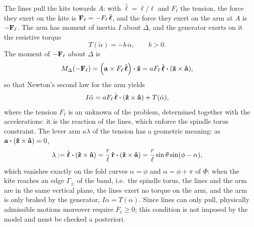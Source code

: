 The lines pull the kite towards \(A\): with \(\hat{\boldsymbol{\ell}} = \boldsymbol{\ell}/\ell\) and \(F_\ell\) the tension, the force they exert on the kite is \(\vb F_\ell = -F_\ell\,\hat{\boldsymbol{\ell}}\), and the force they exert on the arm at \(A\) is \(-\vb F_\ell\).
The arm has moment of inertia \(I\) about \(\Delta\), and the generator exerts on it the resistive torque
\begin{equation}
    T(\dot\alpha) = -b\,\dot\alpha, \qquad b>0.
\end{equation}
The moment of \(-\vb F_\ell\) about \(\Delta\) is
\begin{equation} \label{eq:moment_fell}
    M_\Delta(-\vb F_\ell) = \qty(\vb a\times F_\ell\,\hat{\boldsymbol{\ell}})\vdot\vu z = a F_\ell\,\hat{\boldsymbol{\ell}} \vdot (\vu z \times \vu a),
\end{equation}
so that Newton's second law for the arm yields
\begin{equation} \label{eq:newton_arm}
    I \ddot\alpha = a F_\ell\,\hat{\boldsymbol{\ell}} \vdot (\vu z \times \vu a) + T(\dot \alpha),
\end{equation}
where the tension \(F_\ell\) is an unknown of the problem, determined together with the accelerations: it is the reaction of the lines, which enforce the spindle torus constraint.
The lever arm \(a\lambda\) of the tension has a geometric meaning:
as \(\vb a\vdot(\vu z\times\vu a) = 0\),
\begin{equation} \label{eq:lever-arm}
    \lambda := \hat{\boldsymbol{\ell}} \vdot (\vu z \times \vu a) = \frac{r}{\ell}\,\vu r\vdot(\vu z\times\vu a) = \frac{r}{\ell}\sin\theta\sin(\phi-\alpha),
\end{equation}
which vanishes exactly on the fold curves \(\alpha = \phi\) and \(\alpha = \phi+\pi\) of \(\Phi\): when the kite reaches an edge \(\Gamma_\pm\) of the band, i.e.\ the spindle torus, the lines and the arm are in the same vertical plane, the lines exert no torque on the arm, and the arm is only braked by the generator, \(I\ddot\alpha = T(\dot\alpha)\).
Since lines can only pull, physically admissible motions moreover require \(F_\ell\geq0\); this condition is not imposed by the model and must be checked a posteriori.


